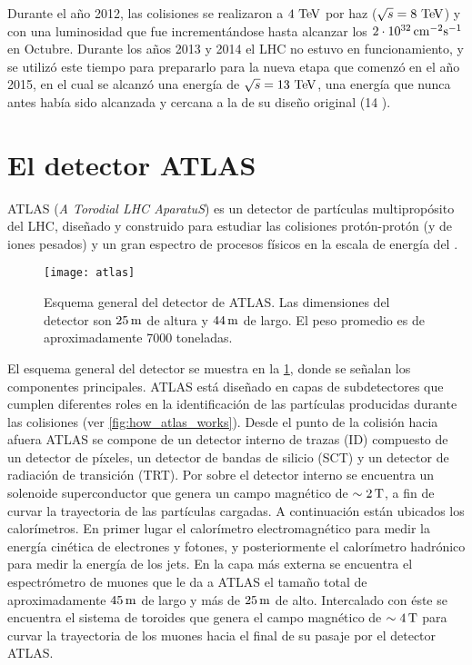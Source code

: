 Durante el año 2012, las colisiones se realizaron a $4\TeV$ por haz ($\sqrt{s} = 8 \TeV$)
y con una luminosidad que fue incrementándose hasta alcanzar los
$\unit[2 \cdot 10^{32}]{cm^{-2}s^{-1}}$ en Octubre. Durante los a\~nos 2013 y 2014
el LHC no estuvo en funcionamiento, y se utilizó este tiempo para prepararlo para
la nueva etapa que comenzó en el a\~no 2015, en el cual se alcanzó una energía de $\sqrt{s} = 13 \tev$,
una energía que nunca antes había sido alcanzada y cercana a la de su diseño
original (14 \tev).



\section{El detector ATLAS}

ATLAS (\emph{A Torodial LHC AparatuS}) es un detector de partículas
multipropósito del LHC, diseñado y construido para estudiar las colisiones
protón-protón (y de iones pesados) y un gran espectro de procesos físicos en la
escala de energía del \tev.

\begin{figure}[!p]
  \centering

  \texttt{[image: atlas]}
  \caption{Esquema general del detector de ATLAS. Las dimensiones del detector
    son $\unit[25]{m}$ de altura y $\unit[44]{m}$ de largo. El peso promedio es
    de aproximadamente 7000 toneladas.}
  \label{fig:atlas}

\end{figure}

El esquema general del detector se muestra en la \cref{fig:atlas}, donde se
señalan los componentes principales. ATLAS está diseñado en capas de
subdetectores que cumplen diferentes roles en la identificación de las
partículas producidas durante las colisiones (ver \cref{fig:how_atlas_works}).
Desde el punto de la colisión
hacia afuera ATLAS se compone de un detector interno de trazas (ID) compuesto de
un detector de píxeles, un detector de bandas de silicio (SCT) y un detector de
radiación de transición (TRT).
Por sobre el detector interno se encuentra un
solenoide superconductor que genera un campo magnético de $\sim \unit[2]{T}$, a fin
de curvar la trayectoria de las partículas cargadas.
A continuación están ubicados los calorímetros. En primer lugar el calorímetro
electromagnético para medir la energía cinética de electrones y fotones, y
posteriormente el calorímetro hadrónico para medir la energía de los jets.
En la capa más externa se encuentra el espectrómetro de muones que le da a ATLAS
el tamaño total de aproximadamente $\unit[45]{m}$ de largo y más de
$\unit[25]{m}$ de alto. Intercalado con éste se encuentra el sistema de toroides
que genera el campo magnético de $\sim \unit[4]{T}$ para curvar la trayectoria de
los muones hacia el final de su pasaje por el detector ATLAS.

